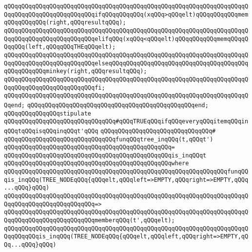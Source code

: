 \verb|qQQqqQQqqQQqqQQqqQQqqQQqqQQqqQQqqQQqqQQqqQQqqQQqqQQqqQQqqQQqqQQqqQQqqQQqqQQqqQQqqQQqqQQqqQQqqQQqifqQQqqQQqqQQq(xqQQq>qQQqelt)qQQqqQQqqQQqmemqQQqqQQqqQQq(right,qQQqresultqQQq);|\newline
\verb|qQQqqQQqqQQqqQQqqQQqqQQqqQQqqQQqqQQqqQQqqQQqqQQqqQQqqQQqqQQqqQQqqQQqqQQqqQQqqQQqqQQqqQQqqQQqqQQqelifqQQq(xqQQq<qQQqelt)qQQqqQQqqQQqmemqQQqqQQqqQQq(left,qQQqqQQqTHEqQQqelt);|\newline
\verb|qQQqqQQqqQQqqQQqqQQqqQQqqQQqqQQqqQQqqQQqqQQqqQQqqQQqqQQqqQQqqQQqqQQqqQQqqQQqqQQqqQQqqQQqqQQqqQQqelseqQQqqQQqqQQqqQQqqQQqqQQqqQQqqQQqqQQqqQQqqQQqqQQqqQQqminkey(right,qQQqresultqQQq);|\newline
\verb|qQQqqQQqqQQqqQQqqQQqqQQqqQQqqQQqqQQqqQQqqQQqqQQqqQQqqQQqqQQqqQQqqQQqqQQqqQQqqQQqqQQqqQQqqQQqqQQqfi;|\newline
\verb|qQQqqQQqqQQqqQQqqQQqqQQqqQQqqQQqqQQqqQQqqQQqqQQqqQQqqQQqqQQqqQQqqQQqqQQqend;|\newline
\verb|qQQqqQQqqQQqqQQqqQQqqQQqqQQqqQQqqQQqqQQqqQQqqQQqend;|\newline
\newline
\verb|qQQqqQQqqQQqqQQqstipulate|\newline
\newline
\verb|qQQqqQQqqQQqqQQqqQQqqQQqqQQqqQQq#qQQqTRUEqQQqifqQQqeveryqQQqitemqQQqinqQQqtqQQqisqQQqinqQQqt'qQQq|\newline
\verb|qQQqqQQqqQQqqQQqqQQqqQQqqQQqqQQq#|\newline
\verb|qQQqqQQqqQQqqQQqqQQqqQQqqQQqqQQqfunqQQqtree_inqQQq(t,qQQqt')|\newline
\verb|qQQqqQQqqQQqqQQqqQQqqQQqqQQqqQQqqQQqqQQqqQQqqQQq=|\newline
\verb|qQQqqQQqqQQqqQQqqQQqqQQqqQQqqQQqqQQqqQQqqQQqqQQqis_inqQQqt|\newline
\verb|qQQqqQQqqQQqqQQqqQQqqQQqqQQqqQQqqQQqqQQqqQQqqQQqwhere|\newline
\verb|qQQqqQQqqQQqqQQqqQQqqQQqqQQqqQQqqQQqqQQqqQQqqQQqqQQqqQQqqQQqqQQqfunqQQqis_inqQQq(TREE_NODEqQQq{qQQqelt,qQQqleft=>EMPTY,qQQqright=>EMPTY,qQQq...qQQq}qQQq)|\newline
\verb|qQQqqQQqqQQqqQQqqQQqqQQqqQQqqQQqqQQqqQQqqQQqqQQqqQQqqQQqqQQqqQQqqQQqqQQqqQQqqQQqqQQqqQQqqQQqqQQq=>|\newline
\verb|qQQqqQQqqQQqqQQqqQQqqQQqqQQqqQQqqQQqqQQqqQQqqQQqqQQqqQQqqQQqqQQqqQQqqQQqqQQqqQQqqQQqqQQqqQQqqQQqmemberqQQq(t',qQQqelt);|\newline
\newline
\verb|qQQqqQQqqQQqqQQqqQQqqQQqqQQqqQQqqQQqqQQqqQQqqQQqqQQqqQQqqQQqqQQqqQQqqQQqqQQqqQQqis_inqQQq(TREE_NODEqQQq{qQQqelt,qQQqleft,qQQqright=>EMPTY,qQQq...qQQq}qQQq)|\newline
